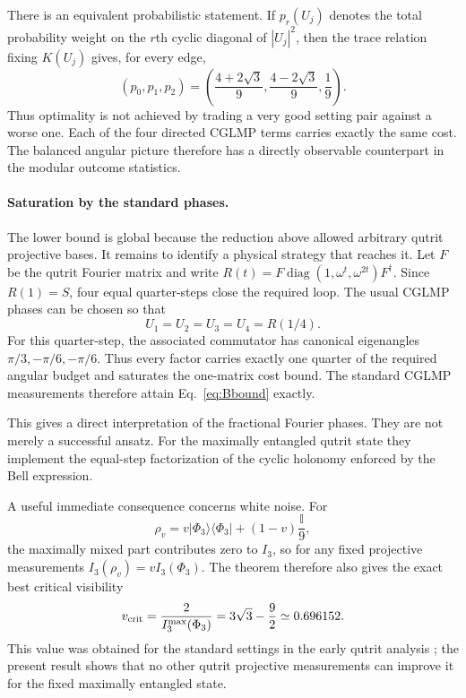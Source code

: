 \documentclass[aps,prl,reprint,superscriptaddress,nofootinbib]{revtex4-2}
\newcommand{\diag}{\operatorname{diag}}
\newcommand{\id}{\mathbb{I}}
\newcommand{\ket}[1]{\lvert #1\rangle}
\newcommand{\bra}[1]{\langle #1\rvert}
\begin{document}
There is an equivalent probabilistic statement. If $p_r(U_j)$ denotes the total probability weight on the $r$th cyclic diagonal of $|U_j|^2$, then the trace relation fixing $K(U_j)$ gives, for every edge,
\begin{equation}
(p_0,p_1,p_2)=\left(\frac{4+2\sqrt3}{9},\frac{4-2\sqrt3}{9},\frac19\right).
\label{eq:edgeprofile}
\end{equation}
Thus optimality is not achieved by trading a very good setting pair against a worse one. Each of the four directed CGLMP terms carries exactly the same cost. The balanced angular picture therefore has a directly observable counterpart in the modular outcome statistics.

\paragraph{Saturation by the standard phases.}
The lower bound is global because the reduction above allowed arbitrary qutrit projective bases. It remains to identify a physical strategy that reaches it. Let $F$ be the qutrit Fourier matrix and write $R(t)=F\diag(1,\omega^t,\omega^{2t})F^\dagger$. Since $R(1)=S$, four equal quarter-steps close the required loop. The usual CGLMP phases can be chosen so that
\begin{equation}
U_1=U_2=U_3=U_4=R(1/4).
\label{eq:quarter}
\end{equation}
For this quarter-step, the associated commutator has canonical eigenangles $\pi/3,-\pi/6,-\pi/6$. Thus every factor carries exactly one quarter of the required angular budget and saturates the one-matrix cost bound. The standard CGLMP measurements therefore attain Eq.~\eqref{eq:Bbound} exactly.

This gives a direct interpretation of the fractional Fourier phases. They are not merely a successful ansatz. For the maximally entangled qutrit state they implement the equal-step factorization of the cyclic holonomy enforced by the Bell expression.

A useful immediate consequence concerns white noise. For
\begin{equation}
\rho_v=v\ket{\Phi_3}\!\bra{\Phi_3}+(1-v)\frac{\id}{9},
\end{equation}
the maximally mixed part contributes zero to $I_3$, so for any fixed projective measurements $I_3(\rho_v)=vI_3(\Phi_3)$. The theorem therefore also gives the exact best critical visibility
\begin{equation}
v_{\rm crit}=\frac{2}{I_3^{\max}(\Phi_3)}=3\sqrt3-\frac92\simeq0.696152.
\label{eq:vcrit}
\end{equation}
This value was obtained for the standard settings in the early qutrit analysis \cite{Acin2002}; the present result shows that no other qutrit projective measurements can improve it for the fixed maximally entangled state.
\end{document}
